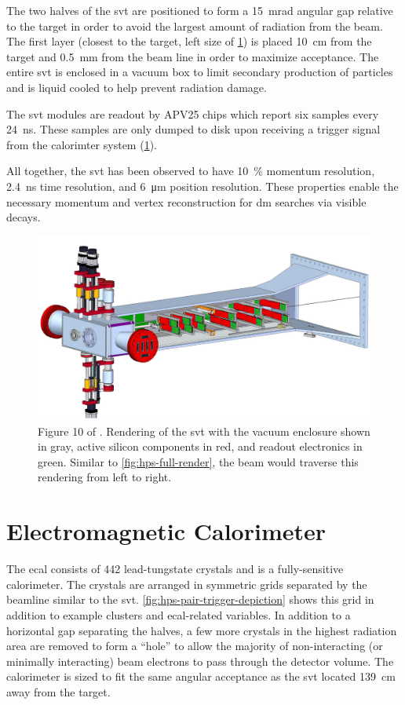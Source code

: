 The two halves of the \ac{svt} are positioned to form a \qty{15}{\milli\radian} angular gap relative
to the target in order to avoid the largest amount of radiation from the beam. The first layer
(closest to the target, left size of \cref{fig:hps-svt-render}) is placed \qty{10}{\cm} from
the target and \qty{0.5}{\mm} from the beam line in order to maximize acceptance. The entire
\ac{svt} is enclosed in a vacuum box to limit secondary production of particles and is liquid
cooled to help prevent radiation damage.

The \ac{svt} modules are readout by APV25 chips which report six samples every \qty{24}{\ns}.
These samples are only dumped to disk upon receiving a trigger signal from the calorimter
system (\cref{sec:hps-ecal}).

All together, the \ac{svt} has been observed to have \num{10}~\% momentum resolution,
\qty{2.4}{\ns} time resolution, and \qty{6}{\micro\meter} position resolution. These
properties enable the necessary momentum and vertex reconstruction for \ac{dm} searches
via visible decays.

\begin{figure}
	\centering
	\includegraphics*[width=\textwidth]{figures/hps/experiment/smkcarty-thesis-fig-10-svt-render.png}
	\caption{
		Figure 10 of \cite{skmccarty-thesis-2020}. Rendering of the \ac{svt} with the vacuum
		enclosure shown in gray, active silicon components in red, and readout electronics in
		green. Similar to \cref{fig:hps-full-render}, the beam would traverse this rendering
		from left to right.
	}
	\label{fig:hps-svt-render}
\end{figure}

\section{Electromagnetic Calorimeter}
\label{sec:hps-ecal}
The \ac{ecal} consists of \num{442} lead-tungstate crystals and is a fully-sensitive calorimeter.
The crystals are arranged in symmetric grids separated by the beamline similar to the \ac{svt}.
\cref{fig:hps-pair-trigger-depiction} shows this grid in addition to example clusters and \ac{ecal}-related
variables. In addition to a horizontal gap separating the halves, a few more crystals in the highest
radiation area are removed to form a ``hole'' to allow the majority of non-interacting (or minimally interacting)
beam electrons to pass through the detector volume. The calorimeter is sized to fit the same
angular acceptance as the \ac{svt} located \qty{139}{\cm} away from the target.

